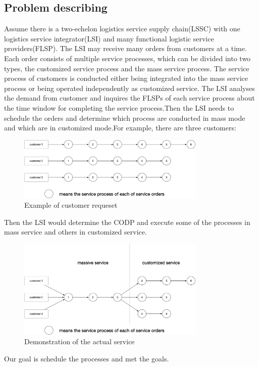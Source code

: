 \documentclass[12pt,a4paper]{article}
\begin{document}
\subsection{Problem describing}    
Assume there is a two-echelon logistics service supply chain(LSSC) with one logistics service integrator(LSI) and many functional logistic service providers(FLSP). The LSI may receive many orders from customers at a time. Each order consists of multiple service processes, which can be divided into two types, the customized service process and the mass service process. The service process of customers is conducted either being integrated into the mass service process or being operated independently as customized service. The LSI analyses the demand from customer and inquires the FLSPs of each service process about the time window for completing the service process.Then the LSI needs to schedule the orders and determine which process are conducted in mass mode and which are in customized mode.For example, there are three customers:
\begin{figure}[h]
\centering
\includegraphics[width=0.8\textwidth]{figures/fig1.png}
\caption{Example of customer requeset}
\end{figure}
Then the LSI would determine the CODP and execute some of the processes in mass service and others in customized service.
\begin{figure}[htbp]
\centering
\includegraphics[width=0.8\textwidth]{figures/fig2.png}
\caption{Demonstration of the actual service}
\end{figure}
Our goal is schedule the processes and met the goals.
\newpage
\end{document}
